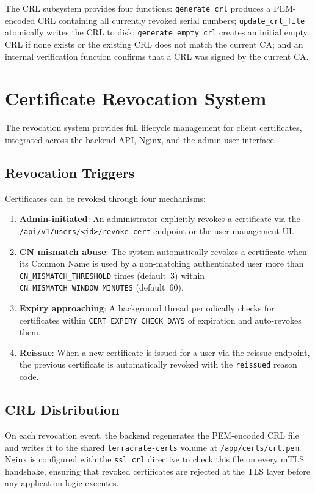 \documentclass[12pt,letterpaper]{report}
\begin{document}
The CRL subsystem provides four functions: \texttt{generate\_crl} produces a PEM-encoded CRL containing all currently revoked serial numbers; \texttt{update\_crl\_file} atomically writes the CRL to disk; \texttt{generate\_empty\_crl} creates an initial empty CRL if none exists or the existing CRL does not match the current CA; and an internal verification function confirms that a CRL was signed by the current CA.

\section{Certificate Revocation System}

The revocation system provides full lifecycle management for client certificates, integrated across the backend API, Nginx, and the admin user interface.

\subsection{Revocation Triggers}

Certificates can be revoked through four mechanisms:

\begin{enumerate}
    \item \textbf{Admin-initiated}: An administrator explicitly revokes a certificate via the \texttt{/api/v1/users/<id>/revoke-cert} endpoint or the user management UI.
    \item \textbf{CN mismatch abuse}: The system automatically revokes a certificate when its Common Name is used by a non-matching authenticated user more than \texttt{CN\_MISMATCH\_THRESHOLD} times (default~3) within \texttt{CN\_MISMATCH\_WINDOW\_MINUTES} (default~60).
    \item \textbf{Expiry approaching}: A background thread periodically checks for certificates within \texttt{CERT\_EXPIRY\_CHECK\_DAYS} of expiration and auto-revokes them.
    \item \textbf{Reissue}: When a new certificate is issued for a user via the reissue endpoint, the previous certificate is automatically revoked with the \texttt{reissued} reason code.
\end{enumerate}

\subsection{CRL Distribution}

On each revocation event, the backend regenerates the PEM-encoded CRL file and writes it to the shared \texttt{terracrate-certs} volume at \texttt{/app/certs/crl.pem}. Nginx is configured with the \texttt{ssl\_crl} directive to check this file on every mTLS handshake, ensuring that revoked certificates are rejected at the TLS layer before any application logic executes.
\end{document}
